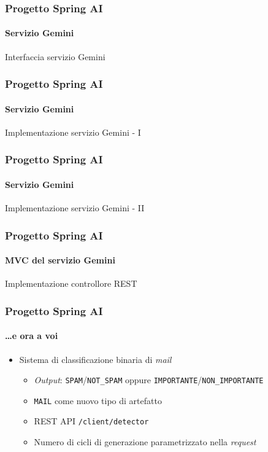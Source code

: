 %
\begin{frame}[t,fragile] \frametitle{Progetto Spring AI}
    \framesubtitle{Servizio Gemini}
        \vspace*{-.7cm}
        \begin{block}{Interfaccia servizio Gemini}
{\tiny}
    \end{block}
\end{frame}
%
\begin{frame}[t,fragile] \frametitle{Progetto Spring AI}
    \framesubtitle{Servizio Gemini}
		\vspace*{-.7cm}
        \begin{block}{Implementazione servizio Gemini - I}
            {\tiny}
    \end{block}
\end{frame}
%
\begin{frame}[t,fragile] \frametitle{Progetto Spring AI}
    \framesubtitle{Servizio Gemini}
        \vspace*{-.7cm}
        \begin{block}{Implementazione servizio Gemini - II}
            {\tiny}
    \end{block}
\end{frame}
%
\begin{frame}[t,fragile] \frametitle{Progetto Spring AI}
    \framesubtitle{MVC del servizio Gemini}
    	\vspace*{-.7cm}
        \begin{block}{Implementazione controllore REST}
			{\tiny}
    	\end{block}
\end{frame}
%
\begin{frame}[t,fragile] \frametitle{Progetto Spring AI}
    \framesubtitle{\ldots e ora a voi}
    {\small
        \begin{itemize}[leftmargin=10pt,align=right]
            \item[\alert{\faArrowCircleRight}] Sistema di classificazione \alert{binaria} di \textit{mail}
            \begin{itemize}[leftmargin=10pt,align=right]
                \item[\alert{\faArrowCircleRight}] \textit{Output}: \texttt{SPAM}/\texttt{NOT\_SPAM} oppure \texttt{IMPORTANTE}/\texttt{NON\_IMPORTANTE}
                \item[\alert{\faArrowCircleRight}] \texttt{MAIL} come nuovo tipo di artefatto 
                \item[\alert{\faArrowCircleRight}] REST API \texttt{/client/detector}
                \item[\alert{\faArrowCircleRight}] Numero di cicli di generazione parametrizzato nella \textit{request}    
            \end{itemize}
        \end{itemize}
    }
\end{frame}
